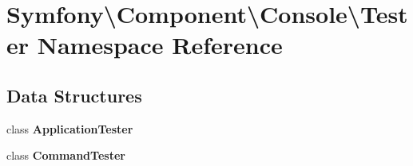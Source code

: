 \section{Symfony\textbackslash{}Component\textbackslash{}Console\textbackslash{}Tester Namespace Reference}
\label{namespace_symfony_1_1_component_1_1_console_1_1_tester}
\subsection*{Data Structures}
\begin{DoxyCompactItemize}
\item 
class {\bf Application\+Tester}
\item 
class {\bf Command\+Tester}
\end{DoxyCompactItemize}
